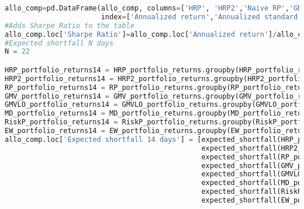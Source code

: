 \begin{lstlisting}[language=Python]
allo_comp=pd.DataFrame(allo_comp, columns=['HRP', 'HRP2','Naive RP','GMV','GMVLO','MD','Risk Parity','EW'],
                       index=['Annualized return','Annualized standard deviance','Expected shortfall'])
#Adds Sharpe Ratio to the table
allo_comp.loc['Sharpe Ratio']=allo_comp.loc['Annualized return']/allo_comp.loc['Annualized standard deviance']
#Expected shortfall N days
N = 22

HRP_portfolio_returns14 = HRP_portfolio_returns.groupby(HRP_portfolio_returns.index // N).sum()
HRP2_portfolio_returns14 = HRP2_portfolio_returns.groupby(HRP2_portfolio_returns.index // N).sum()
RP_portfolio_returns14 = RP_portfolio_returns.groupby(RP_portfolio_returns.index // N).sum()
GMV_portfolio_returns14 = GMV_portfolio_returns.groupby(GMV_portfolio_returns.index // N).sum()
GMVLO_portfolio_returns14 = GMVLO_portfolio_returns.groupby(GMVLO_portfolio_returns.index // N).sum()
MD_portfolio_returns14 = MD_portfolio_returns.groupby(MD_portfolio_returns.index // N).sum()
RiskP_portfolio_returns14 = RiskP_portfolio_returns.groupby(RiskP_portfolio_returns.index // N).sum()
EW_portfolio_returns14 = EW_portfolio_returns.groupby(EW_portfolio_returns.index // N).sum()
allo_comp.loc['Expected shortfall 14 days'] = [expected_shortfall(HRP_portfolio_returns14)[0],
                                               expected_shortfall(HRP2_portfolio_returns14)[0],
                                               expected_shortfall(RP_portfolio_returns14)[0],
                                               expected_shortfall(GMV_portfolio_returns14)[0],
                                               expected_shortfall(GMVLO_portfolio_returns14)[0],
                                               expected_shortfall(MD_portfolio_returns14)[0],
                                               expected_shortfall(RiskP_portfolio_returns14)[0],
                                               expected_shortfall(EW_portfolio_returns14)[0]]
\end{lstlisting}

